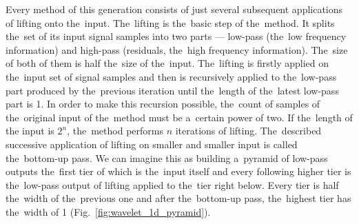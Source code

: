 Every method of this generation consists of just several subsequent applications of lifting onto the~input. The~lifting is the~basic step of the~method. It splits the~set of its input signal samples into two parts --- low-pass (the~low frequency information) and high-pass (residuals, the~high frequency information). The~size of both of them is half the~size of the~input. The~lifting is firstly applied on the~input set of signal samples and then is recursively applied to the~low-pass part produced by the~previous iteration until the~length of the~latest low-pass part is 1. In order to make this recursion possible, the~count of samples of the~original input of the~method must be a~certain power of two. If the~length of the input is $2^n$, the~method performs $n$ iterations of lifting. The~described successive application of lifting on smaller and smaller input is called the~bottom-up pass. We can imagine this as building a~pyramid of low-pass outputs the~first tier of which is the~input itself and every following higher tier is the~low-pass output of lifting applied to the~tier right below. Every tier is half the~width of the~previous one and after the~bottom-up pass, the~highest tier has the~width of 1 (Fig.~\ref{fig:wavelet_1d_pyramid}).

